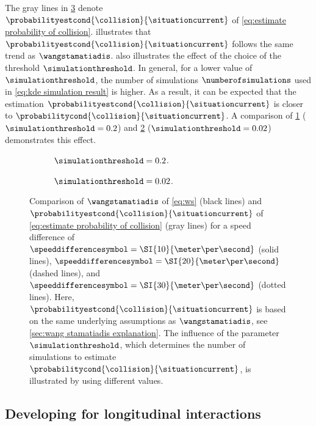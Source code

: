 The gray lines in \cref{fig:ws comparison} denote $\probabilityestcond{\collision}{\situationcurrent}$ of \cref{eq:estimate probability of collision}.
 illustrates that $\probabilityestcond{\collision}{\situationcurrent}$ follows the same trend as $\wangstamatiadis$.
 also illustrates the effect of the choice of the threshold $\simulationthreshold$.
In general, for a lower value of $\simulationthreshold$, the number of simulations $\numberofsimulations$ used in \cref{eq:kde simulation result} is higher. 
As a result, it can be expected that the estimation $\probabilityestcond{\collision}{\situationcurrent}$ is closer to $\probabilitycond{\collision}{\situationcurrent}$.
A comparison of \cref{fig:ws comparison coarse} ($\simulationthreshold=0.2$) and \cref{fig:ws comparison fine} ($\simulationthreshold=0.02$) demonstrates this effect.

\setlength{\figurewidth}{.47\linewidth}
\setlength{\figureheight}{.7\figurewidth}
\begin{figure}
	\centering
	\begin{subfigure}{.49\linewidth}
		\centering
		
		\caption{$\simulationthreshold=0.2$.}
		\label{fig:ws comparison coarse}
	\end{subfigure}
	\begin{subfigure}{.49\linewidth}
		\centering
		
		\caption{$\simulationthreshold=0.02$.}
		\label{fig:ws comparison fine}
	\end{subfigure}
	\caption{Comparison of $\wangstamatiadis$ of \cref{eq:ws} (black lines) and $\probabilityestcond{\collision}{\situationcurrent}$ of \cref{eq:estimate probability of collision} (gray lines) for a speed difference of $\speeddifferencesymbol=\SI{10}{\meter\per\second}$ (solid lines), $\speeddifferencesymbol=\SI{20}{\meter\per\second}$ (dashed lines), and $\speeddifferencesymbol=\SI{30}{\meter\per\second}$ (dotted lines).
		Here, $\probabilityestcond{\collision}{\situationcurrent}$ is based on the same underlying assumptions as $\wangstamatiadis$, see \cref{sec:wang stamatiadis explanation}.
		The influence of the parameter $\simulationthreshold$, which determines the number of simulations to estimate $\probabilitycond{\collision}{\situationcurrent}$, is illustrated by using different values.}
	\label{fig:ws comparison}
\end{figure}



\subsection{Developing  for longitudinal interactions}
\label{sec:ngsim metric}

